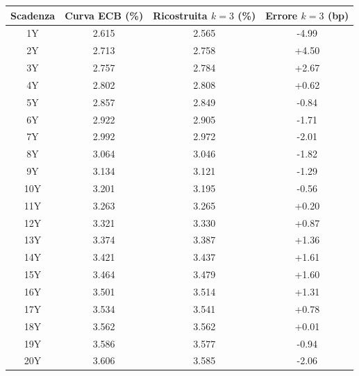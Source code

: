 \begin{center}
\renewcommand{\arraystretch}{1.15}
\begin{tabular}{c c c c}
\toprule
Scadenza & Curva ECB (\%) & Ricostruita $k=3$ (\%) & Errore $k=3$ (bp) \\
\midrule
1Y & 2.615 & 2.565 & -4.99 \\
2Y & 2.713 & 2.758 & +4.50 \\
3Y & 2.757 & 2.784 & +2.67 \\
4Y & 2.802 & 2.808 & +0.62 \\
5Y & 2.857 & 2.849 & -0.84 \\
6Y & 2.922 & 2.905 & -1.71 \\
7Y & 2.992 & 2.972 & -2.01 \\
8Y & 3.064 & 3.046 & -1.82 \\
9Y & 3.134 & 3.121 & -1.29 \\
10Y & 3.201 & 3.195 & -0.56 \\
11Y & 3.263 & 3.265 & +0.20 \\
12Y & 3.321 & 3.330 & +0.87 \\
13Y & 3.374 & 3.387 & +1.36 \\
14Y & 3.421 & 3.437 & +1.61 \\
15Y & 3.464 & 3.479 & +1.60 \\
16Y & 3.501 & 3.514 & +1.31 \\
17Y & 3.534 & 3.541 & +0.78 \\
18Y & 3.562 & 3.562 & +0.01 \\
19Y & 3.586 & 3.577 & -0.94 \\
20Y & 3.606 & 3.585 & -2.06 \\
\bottomrule
\end{tabular}
\end{center}

